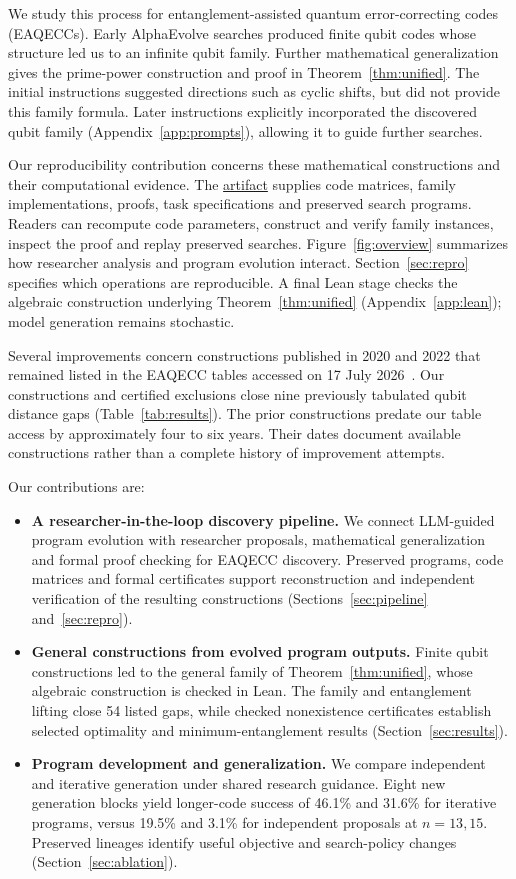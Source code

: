 \documentclass{article}
\newcommand{\artifactlink}{\href{https://github.com/LeGenAI/llm_guided_EAQECC_search/tree/arxiv-v1}{artifact}}
\begin{document}
We study this process for entanglement-assisted quantum error-correcting
codes (EAQECCs). Early AlphaEvolve searches produced finite qubit codes
whose structure led us to an infinite qubit family. Further mathematical
generalization gives the prime-power construction and proof in
Theorem~\ref{thm:unified}. The initial instructions suggested directions
such as cyclic shifts, but did not provide this family formula.
Later instructions explicitly incorporated the discovered qubit family
(Appendix~\ref{app:prompts}), allowing it to guide further searches.

Our reproducibility contribution concerns these mathematical
constructions and their computational evidence. The \artifactlink{} supplies
code matrices, family implementations, proofs, task specifications and
preserved search programs. Readers can recompute code parameters,
construct and verify family instances, inspect the proof and replay
preserved searches. Figure~\ref{fig:overview} summarizes how researcher
analysis and program evolution interact. Section~\ref{sec:repro}
specifies which operations are reproducible. A final Lean stage checks
the algebraic construction underlying Theorem~\ref{thm:unified} (Appendix~\ref{app:lean}); model generation
remains stochastic.

Several improvements concern constructions published in 2020 and 2022
that remained listed in the EAQECC tables accessed on 17 July
2026~\citep{GHW2020,Luo2022}. Our constructions and certified exclusions
close nine previously tabulated qubit distance gaps (Table~\ref{tab:results}).
The prior constructions predate our table access by approximately four
to six years. Their dates document available constructions rather than
a complete history of improvement attempts.

Our contributions are:
\begin{itemize}\setlength{\itemsep}{1pt}
\item \textbf{A researcher-in-the-loop discovery pipeline.}
  We connect LLM-guided program evolution with researcher proposals,
  mathematical generalization and formal proof checking for EAQECC
  discovery. Preserved programs, code matrices and formal certificates
  support reconstruction and independent verification of the resulting
  constructions (Sections~\ref{sec:pipeline} and~\ref{sec:repro}).
\item \textbf{General constructions from evolved program outputs.}
  Finite qubit constructions led to the general family of
  Theorem~\ref{thm:unified}, whose algebraic construction is checked in Lean.
  The family and entanglement lifting close 54 listed gaps, while checked
  nonexistence certificates establish selected optimality and
  minimum-entanglement results (Section~\ref{sec:results}).
\item \textbf{Program development and generalization.} We compare
  independent and iterative generation under shared research guidance.
  Eight new generation blocks yield longer-code success of 46.1\% and
  31.6\% for iterative programs, versus 19.5\% and 3.1\% for independent
  proposals at $n=13,15$. Preserved lineages identify useful objective and
  search-policy changes (Section~\ref{sec:ablation}).
\end{itemize}
\end{document}
